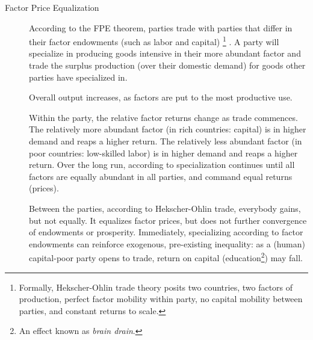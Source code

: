 \begin{description}

	\item[Factor Price Equalization] \label{it:FPE} According to the \gls{FPE} theorem, parties trade with parties that differ in their factor endowments (such as labor and capital) \footnote{
		Formally, Hekscher-Ohlin trade theory posits two countries, two factors of production, perfect factor mobility within party, no capital mobility between parties, and constant returns to scale.} 
	\citep{Stolper1941}. A party will specialize in producing goods intensive in their more abundant factor and trade the surplus production (over their domestic demand) for goods other parties have specialized in. 
	
	Overall output increases, as factors are put to the most productive use.

	Within the party, the relative factor returns change as trade commences. The relatively more abundant factor (in rich countries: capital) is in higher demand and reaps a higher return. The relatively less abundant factor (in poor countries: low-skilled labor) is in higher demand and reaps a higher return. Over the long run, according to \cite{Stolper1941} specialization continues until all factors are equally abundant in all parties, and command equal returns (prices).
	
	Between the parties, according to Hekscher-Ohlin trade, everybody gains, but not equally. It equalizes factor prices, but does not further convergence of endowments or prosperity. Immediately, specializing according to factor endowments can reinforce exogenous, pre-existing inequality: as a (human) capital-poor party opens to trade, return on capital (education\footnote{
		An effect known as \emph{brain drain}.}) 
	may fall.



\end{description}

